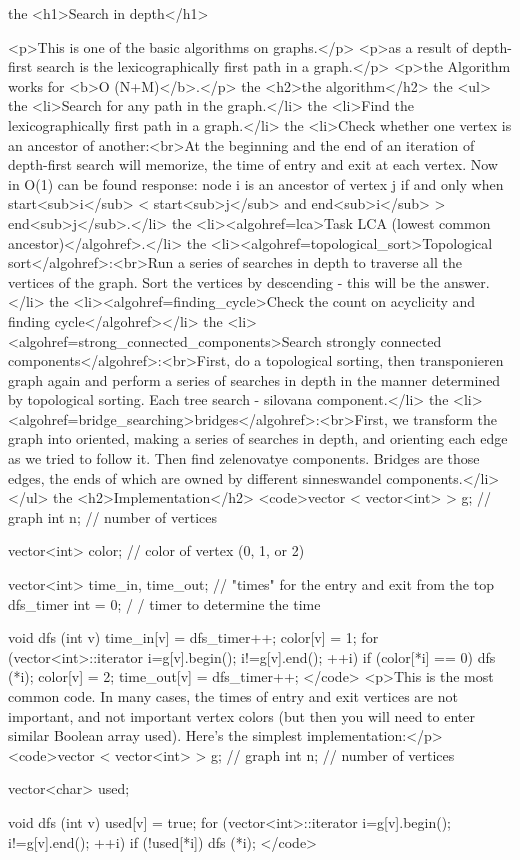 the <h1>Search in depth</h1>

<p>This is one of the basic algorithms on graphs.</p>
<p>as a result of depth-first search is the lexicographically first path in a graph.</p>
<p>the Algorithm works for <b>O (N+M)</b>.</p>
the <h2>the algorithm</h2>
the <ul>
the <li>Search for any path in the graph.</li>
the <li>Find the lexicographically first path in a graph.</li>
the <li>Check whether one vertex is an ancestor of another:<br>At the beginning and the end of an iteration of depth-first search will memorize, the time of entry and exit at each vertex. Now in O(1) can be found response: node i is an ancestor of vertex j if and only when start<sub>i</sub> < start<sub>j</sub> and end<sub>i</sub> > end<sub>j</sub>.</li>
the <li><algohref=lca>Task LCA (lowest common ancestor)</algohref>.</li>
the <li><algohref=topological_sort>Topological sort</algohref>:<br>Run a series of searches in depth to traverse all the vertices of the graph. Sort the vertices by descending - this will be the answer.</li>
the <li><algohref=finding_cycle>Check the count on acyclicity and finding cycle</algohref></li>
the <li><algohref=strong_connected_components>Search strongly connected components</algohref>:<br>First, do a topological sorting, then transponieren graph again and perform a series of searches in depth in the manner determined by topological sorting. Each tree search - silovana component.</li>
the <li><algohref=bridge_searching>bridges</algohref>:<br>First, we transform the graph into oriented, making a series of searches in depth, and orienting each edge as we tried to follow it. Then find zelenovatye components. Bridges are those edges, the ends of which are owned by different sinneswandel components.</li>
</ul>
the <h2>Implementation</h2>
<code>vector < vector<int> > g; // graph
int n; // number of vertices

vector<int> color; // color of vertex (0, 1, or 2)

vector<int> time_in, time_out; // "times" for the entry and exit from the top
dfs_timer int = 0; / / timer to determine the time

void dfs (int v) {
time_in[v] = dfs_timer++;
color[v] = 1;
for (vector<int>::iterator i=g[v].begin(); i!=g[v].end(); ++i)
if (color[*i] == 0)
dfs (*i);
color[v] = 2;
time_out[v] = dfs_timer++;
}</code>
<p>This is the most common code. In many cases, the times of entry and exit vertices are not important, and not important vertex colors (but then you will need to enter similar Boolean array used). Here's the simplest implementation:</p>
<code>vector < vector<int> > g; // graph
int n; // number of vertices

vector<char> used;

void dfs (int v) {
used[v] = true;
for (vector<int>::iterator i=g[v].begin(); i!=g[v].end(); ++i)
if (!used[*i])
dfs (*i);
}</code>